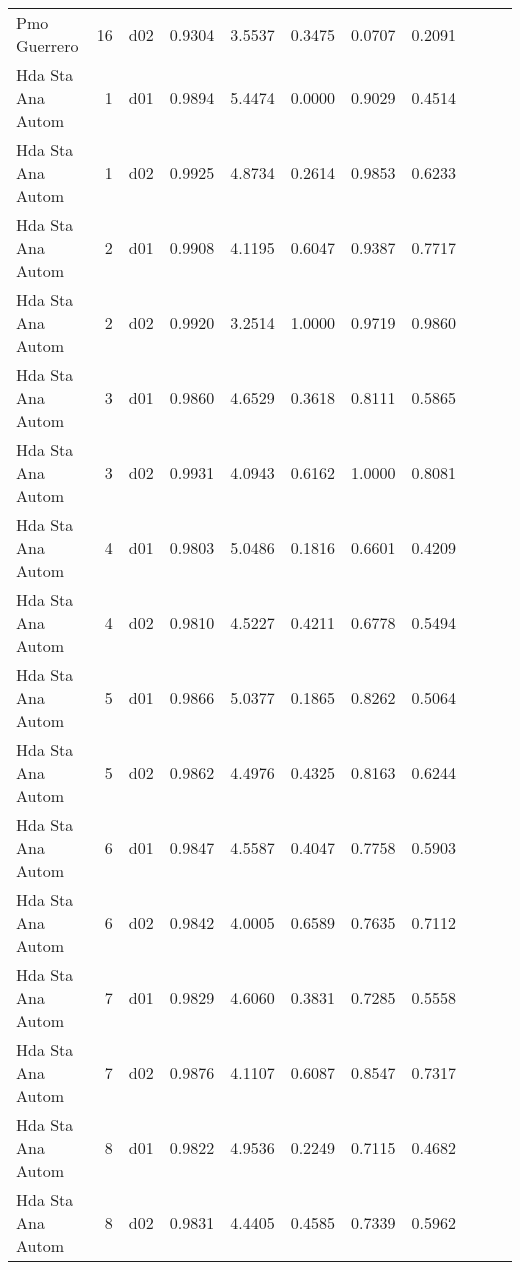\begin{landscape}
\begin{longtable}{p{2cm}rrrrrrrrrr}
         Pmo Guerrero  &         16 &     d02 &   0.9304 &  3.5537 &        0.3475 &           0.0707 &  0.2091 \\
    Hda Sta Ana Autom  &          1 &     d01 &   0.9894 &  5.4474 &        0.0000 &           0.9029 &  0.4514 \\
    Hda Sta Ana Autom  &          1 &     d02 &   0.9925 &  4.8734 &        0.2614 &           0.9853 &  0.6233 \\
    Hda Sta Ana Autom  &          2 &     d01 &   0.9908 &  4.1195 &        0.6047 &           0.9387 &  0.7717 \\
    Hda Sta Ana Autom  &          2 &     d02 &   0.9920 &  3.2514 &        1.0000 &           0.9719 &  0.9860 \\
    Hda Sta Ana Autom  &          3 &     d01 &   0.9860 &  4.6529 &        0.3618 &           0.8111 &  0.5865 \\
    Hda Sta Ana Autom  &          3 &     d02 &   0.9931 &  4.0943 &        0.6162 &           1.0000 &  0.8081 \\
    Hda Sta Ana Autom  &          4 &     d01 &   0.9803 &  5.0486 &        0.1816 &           0.6601 &  0.4209 \\
    Hda Sta Ana Autom  &          4 &     d02 &   0.9810 &  4.5227 &        0.4211 &           0.6778 &  0.5494 \\
    Hda Sta Ana Autom  &          5 &     d01 &   0.9866 &  5.0377 &        0.1865 &           0.8262 &  0.5064 \\
    Hda Sta Ana Autom  &          5 &     d02 &   0.9862 &  4.4976 &        0.4325 &           0.8163 &  0.6244 \\
    Hda Sta Ana Autom  &          6 &     d01 &   0.9847 &  4.5587 &        0.4047 &           0.7758 &  0.5903 \\
    Hda Sta Ana Autom  &          6 &     d02 &   0.9842 &  4.0005 &        0.6589 &           0.7635 &  0.7112 \\
    Hda Sta Ana Autom  &          7 &     d01 &   0.9829 &  4.6060 &        0.3831 &           0.7285 &  0.5558 \\
    Hda Sta Ana Autom  &          7 &     d02 &   0.9876 &  4.1107 &        0.6087 &           0.8547 &  0.7317 \\
    Hda Sta Ana Autom  &          8 &     d01 &   0.9822 &  4.9536 &        0.2249 &           0.7115 &  0.4682 \\
    Hda Sta Ana Autom  &          8 &     d02 &   0.9831 &  4.4405 &        0.4585 &           0.7339 &  0.5962 \\

\end{longtable}
\end{landscape}

